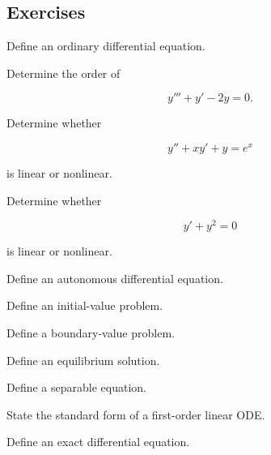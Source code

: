 \subsection{Exercises}
\label{subsec:ode-exercises}

\begin{exercise}[1]
Define an ordinary differential equation.
\end{exercise}

\begin{exercise}[1]
Determine the order of

\[
y'''+y'-2y=0.
\]
\end{exercise}

\begin{exercise}[1]
Determine whether

\[
y''+xy'+y=e^x
\]

is linear or nonlinear.
\end{exercise}

\begin{exercise}[1]
Determine whether

\[
y'+y^2=0
\]

is linear or nonlinear.
\end{exercise}

\begin{exercise}[1]
Define an autonomous differential equation.
\end{exercise}

\begin{exercise}[1]
Define an initial-value problem.
\end{exercise}

\begin{exercise}[1]
Define a boundary-value problem.
\end{exercise}

\begin{exercise}[1]
Define an equilibrium solution.
\end{exercise}

\begin{exercise}[1]
Define a separable equation.
\end{exercise}

\begin{exercise}[1]
State the standard form of a first-order linear ODE.
\end{exercise}

\begin{exercise}[1]
Define an exact differential equation.
\end{exercise}

